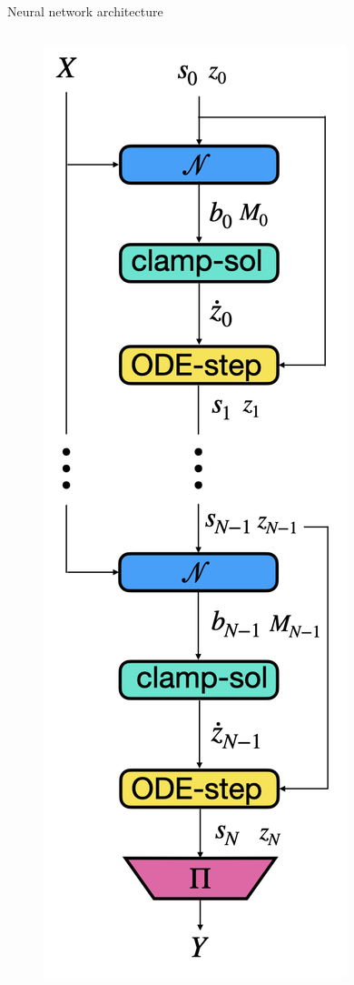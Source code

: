 \documentclass[final]{beamer}
\newlength{\lrcolwidth}
\begin{document}
\begin{frame}[t]
\begin{columns}[t]
\begin{column}{\lrcolwidth}
\begin{block}{Neural network architecture}
\begin{columns}
\begin{column}{0.3\textwidth}
        \begin{figure}[t]
          \centering
          \includegraphics[width=0.8\linewidth]{images/architecture_vert.001.png}         
        \end{figure}
      \end{column}
    \end{columns}


\end{block}
\end{column}
\end{columns}
\end{frame}
\end{document}
